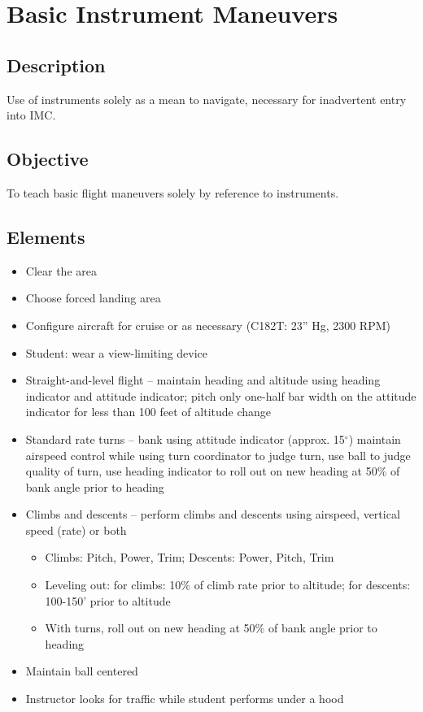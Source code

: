 \section{Basic Instrument Maneuvers}

\subsection{Description}

Use of instruments solely as a mean to navigate,
necessary for inadvertent entry into IMC.

\subsection{Objective}

To teach basic flight maneuvers solely by reference to
instruments.

\subsection{Elements}

\begin{itemize}
  \item Clear the area
  \item Choose forced landing area
  \item Configure aircraft for cruise or as necessary (C182T: 23'' Hg, 2300
    RPM)
  \item Student: wear a view-limiting device
  \item Straight-and-level flight -- maintain heading and altitude using heading
indicator and attitude indicator; pitch only one-half bar width on the attitude
indicator for less than 100 feet of altitude change
  \item Standard rate turns -- bank using attitude indicator (approx.
    15$^\circ$) maintain airspeed control while using turn coordinator to judge
    turn, use ball to judge quality of turn, use heading indicator to roll out
    on new heading at 50\% of bank angle prior to heading
  \item Climbs and descents -- perform climbs and descents using airspeed,
    vertical speed (rate) or both
    \begin{itemize}
      \item Climbs: Pitch, Power, Trim; Descents: Power, Pitch, Trim
      \item Leveling out: for climbs: 10\% of climb rate prior to altitude; for
        descents: 100-150' prior to altitude
      \item With turns, roll out on new heading at 50\% of bank angle prior to
        heading
    \end{itemize}
  \item Maintain ball centered
  \item Instructor looks for traffic while student performs under a hood
\end{itemize}

